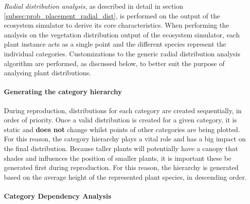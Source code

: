 \textit{Radial distribution analysis}, as described in detail in section \ref{subsec:prob_placement_radial_dist}, is performed on the output of the ecosystem simulator to derive its core characteristics. When performing the analysis on the vegetation distribution output of the ecosystem simulator, each plant instance acts as a single point and the different species represent the individual categories. Customizations to the generic radial distribution analysis algorithm are performed, as discussed below, to better suit the purpose of analysing plant distributions.

\paragraph{Generating the category hierarchy}

During reproduction, distributions for each category are created sequentially, in order of priority. Once a valid distribution is created for a given category, it is static and \textbf{does not} change whilst points of other categories are being plotted. For this reason, the category hierarchy plays a vital role and has a big impact on the final distribution. Because taller plants will potentially have a canopy that shades and influences the position of smaller plants, it is important these be generated first during reproduction. For this reason, the hierarchy is generated based on the average height of the represented plant species, in descending order.

\paragraph{Category Dependency Analysis}

